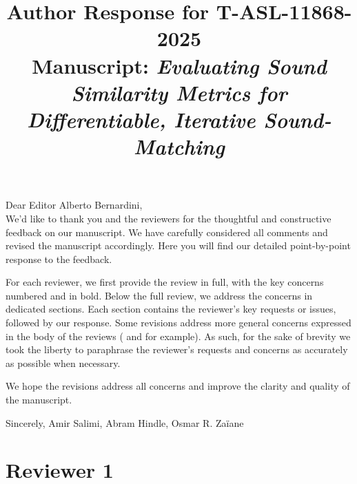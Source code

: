 \documentclass[11pt]{article}
\title{\vspace{-0.5em}Author Response for T-ASL-11868-2025\\
\large Manuscript: \emph{Evaluating Sound Similarity Metrics for Differentiable, Iterative Sound-Matching}}
\author{}
\date{}
\begin{document}
\maketitle
\vspace{-1.25em}

\noindent Dear Editor Alberto Bernardini, \\
\noindent
We'd like to thank you and the reviewers for the thoughtful and constructive feedback on our manuscript. We have carefully considered all comments and revised the manuscript accordingly. Here you will find our detailed point-by-point response to the feedback. 

For each reviewer, we first provide the review in full, with the key concerns numbered and in bold. Below the full review, we address the concerns in dedicated sections. Each section contains the reviewer's key requests or issues, followed by our response. Some revisions address more general concerns expressed in the body of the reviews ( and  for example). As such, for the sake of brevity we took the liberty to paraphrase the reviewer's requests and concerns as accurately as possible when necessary. 

\medskip
\noindent
We hope the revisions address all concerns and improve the clarity and quality of the manuscript.

\noindent Sincerely, Amir Salimi, Abram Hindle, Osmar R. Za{\"i}ane

\section{Reviewer 1}
\end{document}
